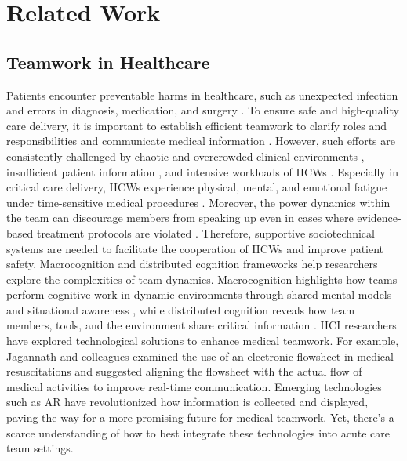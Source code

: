 \section{Related Work}
\subsection{Teamwork in Healthcare}

Patients encounter preventable harms in healthcare, such as unexpected infection and errors in diagnosis, medication, and surgery \cite{panagioti2019prevalence}. 
To ensure safe and high-quality care delivery, it is important to establish efficient teamwork to clarify roles and responsibilities and communicate medical information \cite{barnard2020communication}. 
However, such efforts are consistently challenged by chaotic and overcrowded clinical environments \cite{ahmadpour2021efficiency}, insufficient patient information \cite{bossen2014physicians}, and intensive workloads of HCWs \cite{pine2018data}. 
Especially in critical care delivery, HCWs experience physical, mental, and emotional fatigue under time-sensitive medical procedures \cite{welp2016interplay}. 
Moreover, the power dynamics within the team can discourage members from speaking up even in cases where evidence-based treatment protocols are violated \cite{li2018organizational}.
Therefore, supportive sociotechnical systems are needed to facilitate the cooperation of HCWs and improve patient safety.
Macrocognition and distributed cognition frameworks help researchers explore the complexities of team dynamics. Macrocognition highlights how teams perform cognitive work in dynamic environments through shared mental models and situational awareness \cite{mastrianni2022alerts}, while distributed cognition reveals how team members, tools, and the environment share critical information \cite{sarcevic2011coordinating, zhang2022designing}.
HCI researchers have explored technological solutions to enhance medical teamwork. 
For example, Jagannath and colleagues \cite{jagannath2019temporal} examined the use of an electronic flowsheet in medical resuscitations and suggested aligning the flowsheet with the actual flow of medical activities to improve real-time communication. 
Emerging technologies such as AR have revolutionized how information is collected and displayed, paving the way for a more promising future for medical teamwork. 
Yet, there’s a scarce understanding of how to best integrate these technologies into acute care team settings.


